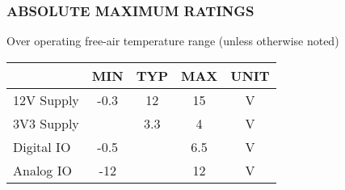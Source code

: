 \subsubsection*{ABSOLUTE MAXIMUM RATINGS}
\small{Over operating free-air temperature range (unless otherwise noted)}
\vspace{-3.5mm}
\begin{table}[h]
    \begin{tabularx}{\textwidth}{|X|c|c|c|c|}
        \hline
                                  & \textbf{ MIN } & \textbf{ TYP } & \textbf{MAX} & \textbf{  UNIT  } \\
        \hline
        12V Supply                & -0.3           & 12             & 15           & V                 \\
        \hline
        3V3 Supply                &                & 3.3            & 4            & V                 \\
        \hline
        Digital IO                & -0.5           &                & 6.5          & V                 \\
        \hline
        Analog IO                 & -12            &                & 12           & V                 \\
        \hline
    \end{tabularx}
\end{table}

